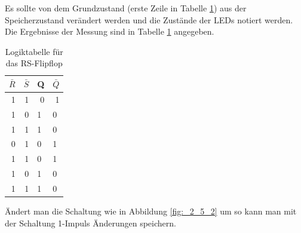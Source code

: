 \documentclass[12pt,a4paper]{article}
\begin{document}
Es sollte von dem Grundzustand (erste Zeile in Tabelle \ref{tab:2_5}) aus der Speicherzustand verändert werden und die Zustände der LEDs notiert werden. Die Ergebnisse der Messung sind in Tabelle \ref{tab:2_5} angegeben.


\begin{table}[H]
\begin{center}
\begin{tabular}{r|r|l|l}

\multicolumn{1}{l|}{$\bar{R}$} & \multicolumn{1}{l|}{$\bar{S}$} & Q & $\bar{Q}$ \\ \hline \hline
1 & 1 & \multicolumn{1}{r|}{0} & \multicolumn{1}{r}{1} \\ 
1 & 0 & 1 & 0 \\ 
1 & 1 & 1 & 0 \\ 
0 & 1 & 0 & 1 \\ 
1 & 1 & 0 & 1 \\ 
1 & 0 & 1 & 0 \\ 
1 & 1 & 1 & 0 \\ 
\end{tabular}
\end{center}
\caption{Logiktabelle für das RS-Flipflop}
\label{tab:2_5}
\end{table}

Ändert man die Schaltung wie in Abbildung \ref{fig:_2_5_2} um so kann man mit der Schaltung 1-Impuls Änderungen speichern.
\end{document}
